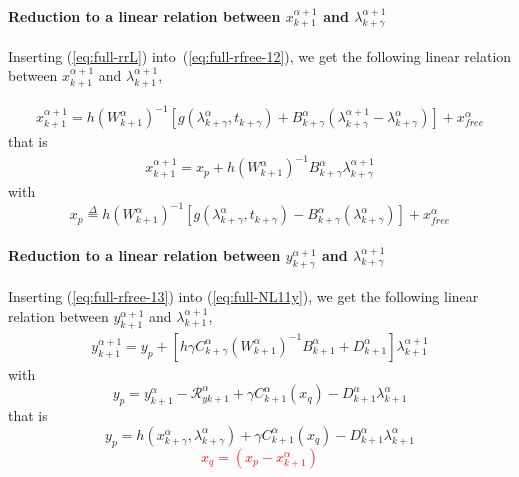 \paragraph{Reduction to a linear relation between  $x^{\alpha+1}_{k+1}$ and
$\lambda^{\alpha+1}_{k+\gamma}$}

Inserting (\ref{eq:full-rrL}) into~(\ref{eq:full-rfree-12}), we get the following linear relation between $x^{\alpha+1}_{k+1}$ and
$\lambda^{\alpha+1}_{k+1}$,

\begin{equation}
   \begin{array}{l}
     x^{\alpha+1}_{k+1} = h(W^{\alpha}_{k+1} )^{-1}\left[g(\lambda^{\alpha}_{k+\gamma},t_{k+\gamma}) +
    B^{\alpha}_{k+\gamma} (\lambda^{\alpha+1}_{k+\gamma} - \lambda^{\alpha}_{k+\gamma}) \right ] +x^\alpha_{free}
\end{array}
\end{equation}
that is
\begin{equation}
  \begin{array}{l}
\boxed{x^{\alpha+1}_{k+1}=x_p + h (W^{\alpha}_{k+1})^{-1}    B^{\alpha}_{k+\gamma} \lambda^{\alpha+1}_{k+\gamma}}
   \end{array}
  \label{eq:full-rfree-13}
\end{equation}
with
\begin{equation}
  \boxed{x_p \stackrel{\Delta}{=}  h(W^{\alpha}_{k+1} )^{-1}\left[g(\lambda^{\alpha}_{k+\gamma},t_{k+\gamma}) -B^{\alpha}_{k+\gamma} (\lambda^{\alpha}_{k+\gamma}) \right ] +x^\alpha_{free}}
\end{equation}


\paragraph{Reduction to a linear relation between  $y^{\alpha+1}_{k+\gamma}$ and
$\lambda^{\alpha+1}_{k+\gamma}$}

Inserting (\ref{eq:full-rfree-13}) into (\ref{eq:full-NL11y}), we get the following linear relation between $y^{\alpha+1}_{k+1}$ and $\lambda^{\alpha+1}_{k+1}$,
\begin{equation}
   \begin{array}{l}
 y^{\alpha+1}_{k+1} = y_p + \left[ h \gamma C^{\alpha}_{k+\gamma} ( W^{\alpha}_{k+1})^{-1}  B^{\alpha}_{k+1} + D^{\alpha}_{k+1} \right]\lambda^{\alpha+1}_{k+1}
   \end{array}
\end{equation}
with
\begin{equation}
y_p = y^{\alpha}_{k+1} -\mathcal R^{\alpha}_{yk+1} + \gamma C^{\alpha}_{k+1}(x_q) - D^{\alpha}_{k+1} \lambda^{\alpha}_{k+1}
\end{equation}
that is
\begin{equation}\boxed{
y_p =  h(x^{\alpha}_{k+\gamma},\lambda^{\alpha}_{k+\gamma}) + \gamma C^{\alpha}_{k+1}(x_q) - D^{\alpha}_{k+1} \lambda^{\alpha}_{k+1} }
\end{equation}
\textcolor{red}{
  \begin{equation}
   \boxed{ x_q=(x_p -x^{\alpha}_{k+1})\label{eq:full-xqq}}
  \end{equation}
}


